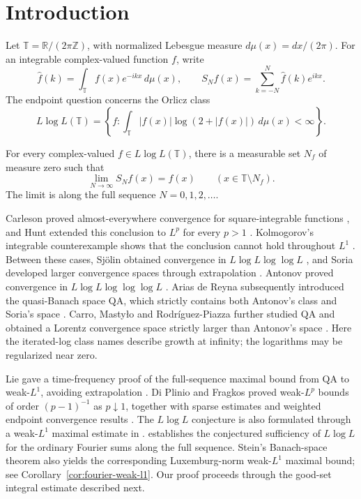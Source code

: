 \section{Introduction}\label{sec:introduction}

Let $\mathbb T=\mathbb R/(2\pi\mathbb Z)$, with normalized Lebesgue
measure $d\mu(x)=dx/(2\pi)$. For an integrable complex-valued function
$f$, write
\[
 \widehat f(k)=\int_{\mathbb T} f(x)e^{-ikx}\,d\mu(x),
 \qquad
 S_N f(x)=\sum_{k=-N}^{N}\widehat f(k)e^{ikx}.
\]
The endpoint question concerns the Orlicz class
\[
 L\log L(\mathbb T)
 =\left\{f:\int_{\mathbb T}|f(x)|\log(2+|f(x)|)\,d\mu(x)<\infty\right\}.
\]

\begin{theorem}
\label{thm:main}
For every complex-valued $f\in L\log L(\mathbb T)$, there is a measurable
set $N_f$ of measure zero such that
\[
 \lim_{N\to\infty}S_Nf(x)=f(x)
 \qquad (x\in\mathbb T\setminus N_f).
\]
The limit is along the full sequence $N=0,1,2,\ldots$.
\end{theorem}

Carleson proved almost-everywhere convergence for square-integrable
functions \cite{Carleson1966}, and Hunt extended this conclusion to
$L^p$ for every $p>1$ \cite{Hunt1968}. Kolmogorov's integrable
counterexample shows that the conclusion cannot hold throughout $L^1$
\cite{Kolmogorov1923}.
Between these cases, Sj\"olin obtained convergence in
$L\log L\log\log L$ \cite{Sjolin1969}, and Soria developed larger
convergence spaces through extrapolation \cite{Soria1985,Soria1989}.
Antonov proved convergence in $L\log L\log\log\log L$
\cite{Antonov1996}. Arias de Reyna subsequently introduced the
quasi-Banach space $\mathrm{QA}$, which strictly contains both Antonov's
class and Soria's space \cite{AriasDeReyna2002}.
Carro, Masty\l{}o and Rodr\'iguez-Piazza further studied $\mathrm{QA}$
and obtained a Lorentz convergence space strictly larger than Antonov's
space \cite{CarroMastyloRodriguezPiazza2012}.
Here the iterated-log class names describe growth at infinity; the
logarithms may be regularized near zero.

Lie gave a time-frequency proof of the full-sequence maximal bound from
$\mathrm{QA}$ to weak-$L^1$, avoiding extrapolation
\cite[Corollary~1.2(5)--(7)]{Lie2013}.
Di Plinio and Fragkos proved weak-$L^p$ bounds of order $(p-1)^{-1}$
as $p\downarrow1$, together with sparse estimates and weighted
endpoint convergence results \cite{DiPlinioFragkos2025}.
The $L\log L$ conjecture is also formulated through a weak-$L^1$
maximal estimate in \cite[Definition~1.1 and Conjecture~1]{Lie2017}.
 establishes the conjectured sufficiency of $L\log L$
for the ordinary Fourier sums along the full sequence.
Stein's Banach-space theorem also yields the corresponding Luxemburg-norm
weak-$L^1$ maximal bound; see Corollary~\ref{cor:fourier-weak-l1}.
Our proof proceeds through the good-set integral estimate described next.

